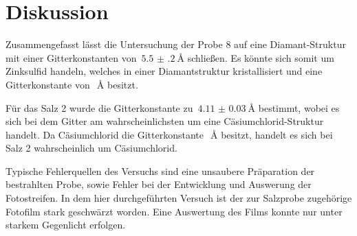 \section{Diskussion}
\label{sec:diskussion}

Zusammengefasst lässt die Untersuchung der Probe 8 auf eine Diamant-Struktur
mit einer Gitterkonstanten von~$\SI{5.5(2)}{\angstrom}$ schließen. Es könnte
sich somit um Zinksulfid handeln, welches in einer Diamantstruktur
kristallisiert und eine Gitterkonstante von~$\SI{}{\angstrom}$ besitzt.

Für das Salz 2 wurde die Gitterkonstante zu~$\SI{4.11(3)}{\angstrom}$ bestimmt,
wobei es sich bei dem Gitter am wahrscheinlichsten um eine
Cäsiumchlorid-Struktur handelt. Da Cäsiumchlorid die
Gitterkonstante~$\SI{}{\angstrom}$ besitzt, handelt es sich bei Salz 2
wahrscheinlich um Cäsiumchlorid.

Typische Fehlerquellen des Versuchs sind eine unsaubere Präparation der
bestrahlten Probe, sowie Fehler bei der Entwicklung und Auswerung der
Fotostreifen. In dem hier durchgeführten Versuch ist der zur Salzprobe
zugehörige Fotofilm stark geschwärzt worden. Eine Auswertung des Films konnte
nur unter starkem Gegenlicht erfolgen. 
